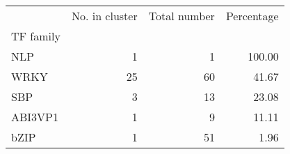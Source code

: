\begin{tabular}{lrrr}
\toprule
{} &  No. in cluster &  Total number &  Percentage \\
TF family &                 &               &             \\
\midrule
NLP       &               1 &             1 &      100.00 \\
WRKY      &              25 &            60 &       41.67 \\
SBP       &               3 &            13 &       23.08 \\
ABI3VP1   &               1 &             9 &       11.11 \\
bZIP      &               1 &            51 &        1.96 \\
\bottomrule
\end{tabular}
